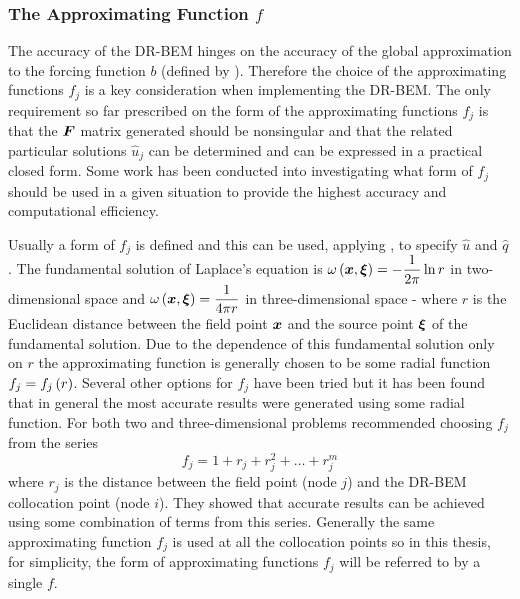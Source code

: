 \subsubsection{The Approximating Function $f$}
\label{sec:approxfnchoice}

The accuracy of the DR-BEM hinges on the accuracy of the global
approximation to the forcing function $b$ (defined by
).  Therefore the choice of the approximating
functions $f_{j}$ is a key consideration when implementing the DR-BEM. The
only requirement so far prescribed on the form of the approximating
functions $f_{j}$ is that the $\matr{F}$ matrix generated should be
nonsingular and that the related particular solutions $\hat{u}_{j}$ can be
determined and can be expressed in a practical closed form.  Some work has
been conducted into investigating what form of $f_{j}$ should be used in a
given situation to provide the highest accuracy and computational
efficiency.

Usually a form of $f_{j}$ is defined and this can be used, applying
, to specify $\hat{u}$ and $\hat{q}$.  The fundamental
solution of Laplace's equation is $\fnof{\omega}{\vect{x},\vect{\xi}} =
-\dfrac{1}{2\pi} \ln r$ in two-dimensional space and
$\fnof{\omega}{\vect{x},\vect{\xi}} = \dfrac{1}{4 \pi r}$ in three-dimensional
space - where $r$ is the Euclidean distance between the field point
$\vect{x}$ and the source point $\vect{\xi}$ of the fundamental
solution.  Due to the dependence of this fundamental solution only on $r$
the approximating function is generally chosen to be some radial function
\ie  $f_{j} =  f_{j}\left( r \right) $. Several other options for $f_{j}$ have been tried
\citep{partridge:1992} but it has been found that in general the most accurate
results were generated using some radial function.  For both two and
three-dimensional problems \citet{wrobel:1986} recommended choosing
$f_{j}$ from the series
\begin{equation}
  f_{j} = 1 + r_{j} + r_{j}^{2} +\ldots+ r_{j}^{m}
\label{eq:fdefine}
\end{equation}
where $r_{j}$ is the distance between the field point (node $j$) and the
DR-BEM collocation point (node $i$).  They showed that accurate results can
be achieved using some combination of terms from this series.  Generally
the same approximating function $f_{j}$ is used at all the collocation
points so in this thesis, for simplicity, the form of approximating
functions $f_{j}$ will be referred to by a single $f$.

